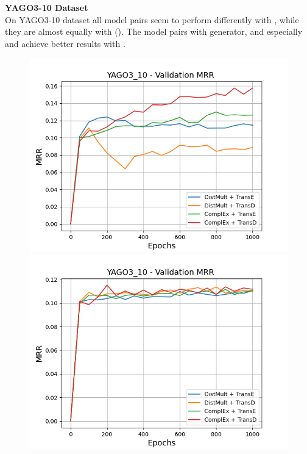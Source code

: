 \textbf{YAGO3-10 Dataset}
\label{subsubsec:methods_yago3_10}\\
%
On \textsc{YAGO3-10} dataset all model pairs seem to perform differently with \usmax, while they are almost equally with \ussoftmax ().
The model pairs with \complex generator, and especially \complex and \transd achieve better results with \usmax.
\begin{figure}[H]
    \centering
    \begin{minipage}{.5\textwidth}
      \centering
      \includegraphics[width=0.9\linewidth]{figures/results/gan_train/not_pretrained/uncertainty/max/entropy/yago3_10/1k_epochs/uncertainty_yago3_10_mrrs.png}
    \end{minipage}%
    \begin{minipage}{.5\textwidth}
      \centering
      \includegraphics[width=0.9\linewidth]{figures/results/gan_train/not_pretrained/uncertainty/max_distribution/entropy/yago3_10/1k_epochs/uncertainty_yago3_10_mrrs.png}

\end{minipage}
\end{figure}
